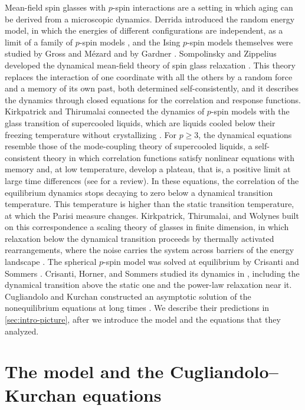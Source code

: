 Mean-field spin glasses with $p$-spin interactions are a setting in which aging can be derived from a microscopic dynamics. Derrida introduced the random energy model, in which the energies of different configurations are independent, as a limit of a family of $p$-spin models \cite{derrida1980}, and the Ising $p$-spin models themselves were studied by Gross and M\'ezard \cite{grossmezard1984} and by Gardner \cite{gardner1985}. Sompolinsky and Zippelius developed the dynamical mean-field theory of spin glass relaxation \cite{sz1981,sz1982}. This theory replaces the interaction of one coordinate with all the others by a random force and a memory of its own past, both determined self-consistently, and it describes the dynamics through closed equations for the correlation and response functions. Kirkpatrick and Thirumalai connected the dynamics of $p$-spin models with the glass transition of supercooled liquids, which are liquids cooled below their freezing temperature without crystallizing \cite{kt1987a,kt1987b}. For $p\ge3$, the dynamical equations resemble those of the mode-coupling theory of supercooled liquids, a self-consistent theory in which correlation functions satisfy nonlinear equations with memory and, at low temperature, develop a plateau, that is, a positive limit at large time differences (see \cite{goetzesjogren1992} for a review). In these equations, the correlation of the equilibrium dynamics stops decaying to zero below a dynamical transition temperature. This temperature is higher than the static transition temperature, at which the Parisi measure changes. Kirkpatrick, Thirumalai, and Wolynes built on this correspondence a scaling theory of glasses in finite dimension, in which relaxation below the dynamical transition proceeds by thermally activated rearrangements, where the noise carries the system across barriers of the energy landscape \cite{ktw1989}. The spherical $p$-spin model was solved at equilibrium by Crisanti and Sommers \cite{cs1992}. Crisanti, Horner, and Sommers studied its dynamics in \cite{chs1993}, including the dynamical transition above the static one and the power-law relaxation near it. Cugliandolo and Kurchan constructed an asymptotic solution of the nonequilibrium equations at long times \cite{ck1993}. We describe their predictions in \cref{sec:intro-picture}, after we introduce the model and the equations that they analyzed.

\section{The model and the Cugliandolo--Kurchan equations}\label{sec:intro-model}

